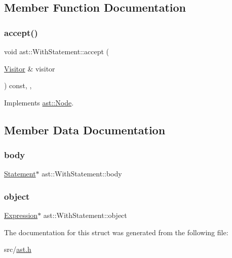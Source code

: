 \subsection{Member Function Documentation}
\mbox{\label{structast_1_1_with_statement_ac2a6b5840df0da325c403fddf3dd3905}} 
\subsubsection{\texorpdfstring{accept()}{accept()}}
{\footnotesize\ttfamily void ast\+::\+With\+Statement\+::accept (\begin{DoxyParamCaption}\item[{\hyperlink{structast_1_1_visitor}{Visitor} \&}]{visitor }\end{DoxyParamCaption}) const\hspace{0.3cm}{\ttfamily [inline]}, {\ttfamily [override]}, {\ttfamily [virtual]}}



Implements \hyperlink{structast_1_1_node_abc089ee6caaf06a4445ebdd8391fdebc}{ast\+::\+Node}.



\subsection{Member Data Documentation}
\mbox{\label{structast_1_1_with_statement_ae51c0f91d7f0c15c895892d40bed9768}} 
\subsubsection{\texorpdfstring{body}{body}}
{\footnotesize\ttfamily \hyperlink{structast_1_1_statement}{Statement}$\ast$ ast\+::\+With\+Statement\+::body}

\mbox{\label{structast_1_1_with_statement_a8b135f7c09159d03c4c1cf6c0ff907ae}} 
\subsubsection{\texorpdfstring{object}{object}}
{\footnotesize\ttfamily \hyperlink{structast_1_1_expression}{Expression}$\ast$ ast\+::\+With\+Statement\+::object}



The documentation for this struct was generated from the following file\+:\begin{DoxyCompactItemize}
\item 
src/\hyperlink{ast_8h}{ast.\+h}\end{DoxyCompactItemize}
